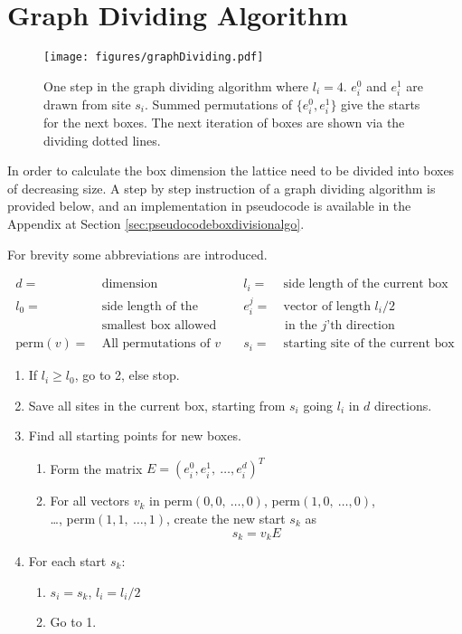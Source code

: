 \section{Graph Dividing Algorithm}
\label{sec:GraphDivisonAlgorithm}

\begin{figure}[h!]
    \centering
        \texttt{[image: figures/graphDividing.pdf]}
    \caption{One step in the graph dividing algorithm where $l_i = 4$. $e^0_i$ and $e^1_i$ are drawn from site $s_i$. Summed permutations of $\{e^0_i, e^1_i\}$ give the starts for the next boxes. The next iteration of boxes are shown via the dividing dotted lines.}
    \label{fig:graphdividingalgo}
\end{figure}

In order to calculate the box dimension the lattice need to be divided into boxes of decreasing size. A step by step instruction of a graph dividing algorithm is provided below, and an implementation in pseudocode is available in the Appendix at Section \ref{sec:pseudocodeboxdivisionalgo}.

For brevity some abbreviations are introduced.

\begin{equation*}
    \begin{aligned}
        d =& \ \text{dimension} &\quad l_i =& \ \text{side length of the current box}\\
%
        l_0 =& \ \text{side length of the} &\quad e_i^j =& \ \text{vector of length } l_i / 2 \\
%
             & \ \text{smallest box allowed} & & \text{ in the }j\text{'th direction} \\
%
        \text{perm}(v) =& \ \text{All permutations of } v &\quad s_i =& \ \text{starting site of the current box}
    \end{aligned}
\end{equation*}

\begin{enumerate}
    \item If $l_i \geq l_0$, go to 2, else stop.
%
    \item Save all sites in the current box, starting from $s_i$ going $l_i$ in $d$ directions.
%
    \item Find all starting points for new boxes.
%
    \begin{enumerate}[label=(\roman*)]
%
        \item Form the matrix $E = (e_i^0, e_i^1, \  \ldots, e_i^d)^T$
%
        \item For all vectors $v_k$ in perm$(0, 0, \ \ldots , 0)$, perm$(1, 0, \ \ldots , 0)$, \\ \ldots, perm$(1, 1, \ \ldots , 1)$, create the new start $s_k$ as $$s_k = v_k E$$
%
    \end{enumerate}
%
    \item For each start $s_k$:
    \begin{enumerate}[label=(\roman*)]
        \item $s_i = s_k$, $l_i = l_i / 2$
        \item Go to 1.
    \end{enumerate}
%
\end{enumerate}

